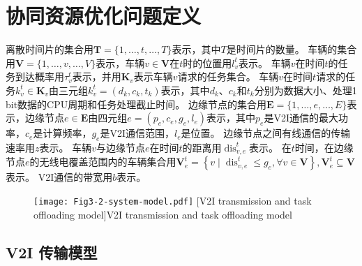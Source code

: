 \section{协同资源优化问题定义}\label{section 3-3}

离散时间片的集合用$\mathbf{T}=\{1, \ldots, t, \ldots, T\}$表示，其中$T$是时间片的数量。
车辆的集合用$\mathbf{V}=\{1, \ldots, v, \ldots, V\}$表示，车辆$v \in \mathbf{V}$在$t$时的位置用$l_{v}^{t}$表示。
车辆$v$在时间$t$的任务到达概率用$\tau_{v}^{t}$表示，并用$\mathbf{K}_{v}$表示车辆$v$请求的任务集合。
车辆$v$在时间$t$请求的任务$k_{v}^{t} \in \mathbf{K}_{v}$由三元组$k_{v}^{t}=\left(d_{k}, c_{k}, t_{k}\right)$表示，其中$d_{k}$、$c_{k}$和$t_{k}$分别为数据大小、处理1 bit数据的CPU周期和任务处理截止时间。
边缘节点的集合用$\mathbf{E}=\{1, \ldots, e, \ldots, E\}$表示，边缘节点$e \in \mathbf{E}$由四元组$e=\left(p_{e}, c_{e}, g_{e}, l_{e}\right)$表示，其中$p_{e}$是V2I通信的最大功率，$c_{e}$是计算频率，$g_e$是V2I通信范围，$l_{e}$是位置。
边缘节点之间有线通信的传输速率用$z$表示。
车辆$v$与边缘节点$e$在时间$t$的距离用$\operatorname{dis}_{v, e}^{t}$表示。
在$t$时间，在边缘节点$e$的无线电覆盖范围内的车辆集合用$\mathbf{V}_{e}^{t}=\left\{v \mid \operatorname{dis}_{v, e}^{t} \leq g_{e}, \forall v \in \mathbf{V}\right\}, \mathbf{V}_{e}^{t} \subseteq \mathbf{V}$表示。
V2I通信的带宽用$b$表示。

\begin{figure}[h]
\centering
  \texttt{[image: Fig3-2-system-model.pdf]}
  [V2I transmission and task offloading model]{V2I transmission and task offloading model}
  \label{fig 3-2}
\end{figure}

\subsection{V2I 传输模型}

